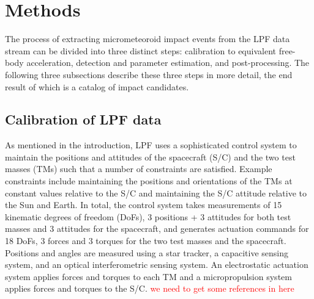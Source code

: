 \documentclass[twocolumn, trackchanges]{aastex62}
\newcommand{\red}[1]{\textcolor{red}{#1}}
\begin{document}
\section{Methods} \label{sec:methods}
The process of extracting micrometeoroid impact events from the LPF data stream can be divided into three distinct steps: calibration to equivalent free-body acceleration, detection and parameter estimation, and post-processing.  The following three subsections describe these three steps in more detail, the end result of which is a catalog of impact candidates.


\subsection{Calibration of LPF data}\label{sec:calibration}
As mentioned in the introduction, LPF uses a sophisticated control system to maintain the positions and attitudes of the spacecraft (S/C) and the two test masses (TMs) such that a number of constraints are satisfied.  Example constraints include maintaining the positions and orientations of the TMs at constant values relative to the S/C and maintaining the S/C attitude relative to the Sun and Earth. In total, the control system takes measurements of 15 kinematic degrees of freedom (DoFs), 3 positions + 3 attitudes for both test masses and 3 attitudes for the spacecraft, and generates actuation commands for 18 DoFs, 3 forces and 3 torques for the two test masses and the spacecraft.  Positions and angles are measured using a star tracker, a capacitive sensing system, and an optical interferometric sensing system. An electrostatic actuation system applies forces and torques to each TM and a micropropulsion system applies forces and torques to the S/C. \red{we need to get some references in here}
\end{document}
